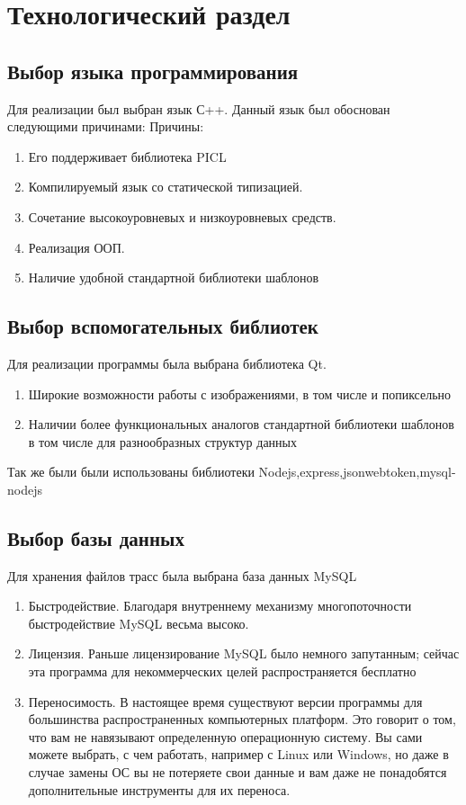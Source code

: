 \chapter{Технологический раздел}
\section{Выбор  языка программирования}
Для реализации  был выбран язык  С++. Данный язык был обоснован следующими причинами:
Причины:
\begin{enumerate}
	 \item Его поддерживает библиотека PICL
	 \item Компилируемый язык со статической типизацией. 
	 \item Сочетание высокоуровневых и низкоуровневых средств.
	 \item Реализация ООП.
	 \item Наличие удобной стандартной библиотеки шаблонов
	 \end{enumerate}
\section{Выбор вспомогательных библиотек}
Для реализации программы была выбрана библиотека Qt.
\begin{enumerate}
	\item Широкие возможности работы с изображениями, в том числе и попиксельно
	\item Наличии более функциональных аналогов стандартной библиотеки шаблонов в том числе для разнообразных структур данных
\end{enumerate}
Так же были были использованы библиотеки Nodejs,express,jsonwebtoken,mysql-nodejs
\section{Выбор базы данных}
Для хранения файлов трасс была выбрана база данных MySQL
\begin{enumerate}
	\item Быстродействие. Благодаря внутреннему механизму многопоточности быстродействие MySQL весьма высоко.
	\item Лицензия. Раньше лицензирование MySQL было немного запутанным; сейчас эта программа для некоммерческих целей распространяется бесплатно
	\item Переносимость. В настоящее время существуют версии программы для большинства распространенных компьютерных платформ. Это говорит о том, что вам не навязывают определенную операционную систему. Вы сами можете выбрать, с чем работать, например с Linux или Windows, но даже в случае замены ОС вы не потеряете свои данные и вам даже не понадобятся дополнительные инструменты для их переноса.
\end{enumerate}




